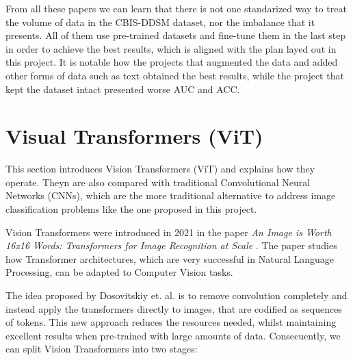 \documentclass[ENG]{TFUOC}%
\begin{document}
From all these papers we can learn that there is not one standarized way to treat the volume of data in the CBIS-DDSM dataset, nor the imbalance that it presents. All of them use pre-trained datasets and fine-tune them in the last step in order to achieve the best results, which is aligned with the plan layed out in this project. It is notable how the projects that augmented the data and added other forms of data such as text obtained the best results, while the project that kept the dataset intact presented worse AUC and ACC.

\section{Visual Transformers (ViT)}\label{ViT}
This section introduces Vision Transformers (ViT) and explains how they operate. Theyn are also compared with traditional Convolutional Neural Networks (CNNs), which are the more traditional alternative to address image classification problems like the one proposed in this project.

Vision Transformers were introduced in 2021 in the paper \textit{An Image is Worth 16x16 Words: Transformers for Image Recognition at Scale} \cite{ViT_original_paper}. The paper studies how Transformer architectures, which are very successful in Natural Language Processing, can be adapted to Computer Vision tasks. 

The idea proposed by Dosovitskiy et. al. \cite{ViT_original_paper} is to remove convolution completely and instead apply the transformers directly to images, that are codified as sequences of tokens. This new approach reduces the resources needed, whilst maintaining excellent results when pre-trained with large amounts of data. Consecuently, we can split Vision Transformers into two stages:
\end{document}
